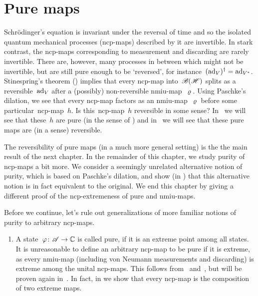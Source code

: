 \section{Pure maps}
\begin{parsec}%
\begin{point}%
Schr\"odinger's equation is invariant under the reversal of time
    and so the isolated quantum mechanical processes (ncp-maps) described by
    it are invertible.
In stark contrast, the ncp-maps corresponding to measurement and discarding
    are rarely invertible.
There are, however, many  processes in between
    which might not be invertible, but are still pure enough to be `reversed',
    for instance~$(\mathrm{ad}_V)^\dagger = \mathrm{ad}_{V^*}$.
    Stinespring's theorem () implies that every ncp-map into~$\mathscr{B}(\mathscr{H})$
    splits as a reversible~$\mathrm{ad}_V$ after a (possibly) non-reversible
    nmiu-map~$\varrho$.
Using Paschke's dilation,
    we see that every ncp-map factors
    as an nmiu-map~$\varrho$ before some particular~ncp-map~$h$.
Is this~ncp-map~$h$ reversible in some sense?
In~ we will see that these~$h$
    are pure (in the sense of )
    and in~
    we will see that these pure maps are (in a sense) reversible.
\begin{point}%
The reversibility of pure maps (in a much more general setting)
    is the the main result of the next chapter.
In the remainder of this chapter, we study purity of ncp-maps a bit more.
We consider a seemingly unrelated  alternative notion of purity,
    which is based on Paschke's dilation,
    and show (in )
    that this alternative notion is in fact equivalent to the original.
We end this chapter by giving a different proof
    of the ncp-extremeness of pure and nmiu-maps.
\end{point}
\begin{point}%
Before we continue, let's rule out generalizations
    of more familiar notions of purity
    to arbitrary ncp-maps.
\begin{enumerate}
\item
A state~$\varphi\colon \mathscr{A} \to \mathbb{C}$ is called pure, if it is an extreme
    point among all states.
It is unreasonable to define an arbitrary ncp-map to be pure
    if it is extreme, as every nmiu-map (including 
    von Neumann measurements and discarding)
    is extreme among the unital ncp-maps.
This follows from~ and~,
    but will be proven again in~.
In fact, in 
    we show that every ncp-map is the composition
    of two extreme maps.


\end{enumerate}
\end{point}
\end{point}
\end{parsec}
